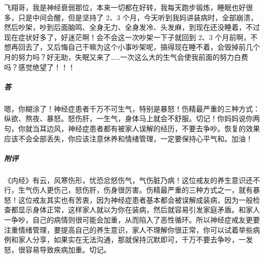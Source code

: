 \begin{case}
    飞翔哥，我是神经衰弱那位，本来一切都在好转，我每天跑步锻炼，睡眠也好很多，只是中间会醒，但是坚持了 2、3 个月，今天听到我妈讲装病时，全部崩溃，然后吵架，吵到后面脑鸣、全身无力、全身发冷、头发麻，到现在还没睡着，不过现在症状好多了，好迷茫啊！会不会这一次吵架一下子就回到 2、3 个月前啊，不想再回去了，又后悔自己干嘛为这个小事吵架呢，搞得现在睡不着，会毁掉前几个月的努力吗？好无助，失眠又来了……一次这么大的生气会使我前面的努力白费吗？感觉绝望了！！！
    \subparagraph{答} 嗯，你糊涂了！神经症患者千万不可生气，特别是暴怒！伤精最严重的三种方式：纵欲、熬夜、暴怒。怒伤肝，一生气，身体马上就会不舒服。切记！你妈妈说你两句，你就当耳边风，神经症患者都有被家人误解的经历，不要去争吵。恢复的效果应该不会全部丢失，你应该注意休养和情绪管理，一定要保持心平气和。加油！
    \subparagraph{附评} 《内经》有云，风寒伤形，忧恐忿怒伤气，气伤脏乃病！这位戒友的养生意识还不行，生气伤人更伤己，怒伤肝，伤身很厉害。伤精最严重的三种方式之一，就有暴怒！这位戒友其实也有苦衷，因为神经症患者基本都会被误解成装病，因为一般检查都显示身体正常，这样家人就以为你在装病，然后就容易引发家庭矛盾。和家人一争吵，自己的病情则很可能会加重，从而陷入了恶性循环。所以神经症戒友更要注重情绪管理，要提高自己的养生意识，家人不理解你很正常，你可以试着举些病例和家人分享，如果实在无法沟通，那就保持沉默即可，千万不要去争吵，一发怒，很容易导致疾病加重。切记。
\end{case}

